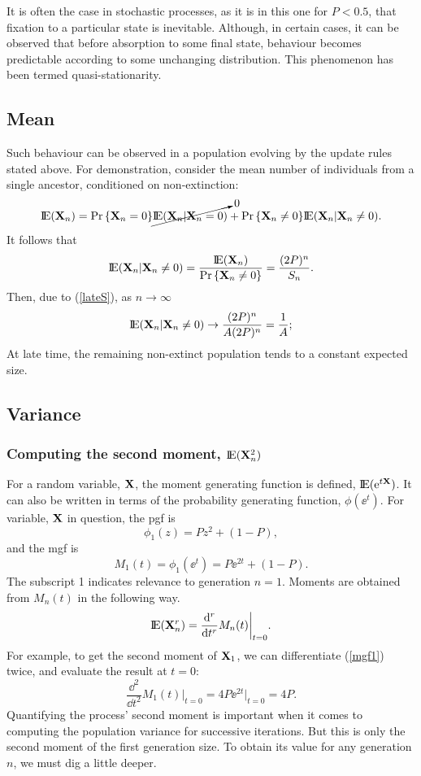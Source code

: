 It is often the case in stochastic processes, as it is in this one for $P<0.5$, that fixation to a particular state is inevitable. Although, in certain cases, it can be observed that before absorption to some final state, behaviour becomes predictable according to some unchanging distribution. This phenomenon has been termed quasi-stationarity. 


\subsection{Mean}
Such behaviour can be observed in a population evolving by the update rules stated above. For demonstration, consider the mean number of individuals from a single ancestor, conditioned on non-extinction: 
$${\rm I}\!{\rm E}({\bf X}_n) = {\text{Pr}\left\{{\bf X}_n =0\right\}} \cancelto{0}{{\rm I}\!{\rm E}({\bf X}_n|{\bf X}_n =0)}  + {\text{Pr}\left\{{\bf X}_n \neq 0\right\}}{\rm I}\!{\rm E}({\bf X}_n|{\bf X}_n \neq0).$$
It follows that 
$${\rm I}\!{\rm E}({\bf X}_n|{\bf X}_n \neq 0) =\frac{{\rm I}\!{\rm E}({\bf X}_n)}{{\text{Pr}\left\{{\bf X}_n\neq 0\right\}}} = \frac{(2P)^n}{S_n} .$$ 
Then, due to (\ref{lateS}), as $n\to\infty$
$${\rm I}\!{\rm E}({\bf X}_n|{\bf X}_n \neq 0) \to \frac{(2P)^n}{A(2P)^n} = \frac{1}{A};$$
At late time, the remaining non-extinct population tends to a constant expected size.

\subsection{Variance}

\subsubsection{Computing the second moment, ${\rm I}\!{\rm E}({\bf X}_n^2)$}

For a random variable, ${\bf X}$, the moment generating function is defined, ${\rm I}\!{\rm E}({\rm e}^{t{\bf X}})$. It can also be written in terms of the probability generating function, $\phi(\ee^t)$. For variable, ${\bf X}$ in question, the pgf is 
\begin{equation*}
\phi_1(z) = Pz^2 + (1-P),
\end{equation*}
and the mgf is 
\begin{equation}
\label{mgf1}
M_1(t) = \phi_1(\ee^t) = P\ee^{2t} + (1-P).
\end{equation}
The subscript 1 indicates relevance to generation $n = 1$. Moments are obtained from $M_n(t)$ in the following way.
\begin{equation}
\label{mgf2}
{\rm I}\!{\rm E}({\bf X}_n^r) = \frac{{\rm d}^r}{{\rm d} t^r} M_n(t)\bigg|_{t=0}.
\end{equation}
For example, to get the second moment of ${\bf X}_1$, we can differentiate (\ref{mgf1}) twice, and evaluate the result at $t=0$:
$$ \frac{\dd^2}{\dd t^2} M_1(t)\bigg|_{t=0} = 4P\ee^{2t}\big|_{t=0} = 4P.$$
Quantifying the process' second moment is important when it comes to computing the population variance for successive iterations. But this is only the second moment of the first generation size. To obtain its value for any generation $n$, we must dig a little deeper.  

